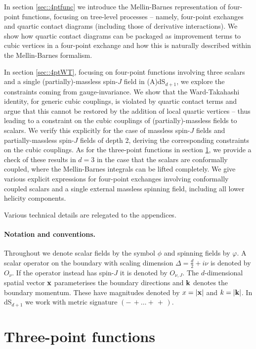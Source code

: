 \documentclass[11pt,a4paper]{article}
\begin{document}
In section \ref{sec::4ptfunc} we introduce the Mellin-Barnes representation of four-point functions, focusing on tree-level processes -- namely, four-point exchanges and quartic contact diagrams (including those of derivative interactions). We show how quartic contact diagrams can be packaged as improvement terms to cubic vertices in a four-point exchange and how this is naturally described within the Mellin-Barnes formalism.

In section \ref{sec::4ptWT}, focusing on four-point functions involving three scalars and a single (partially)-massless spin-$J$ field in (A)dS$_{d+1}$, we explore the constraints coming from gauge-invariance. We show that the Ward-Takahashi identity, for generic cubic couplings, is violated by quartic contact terms and argue that this cannot be restored by the addition of local quartic vertices -- thus leading to a constraint on the cubic couplings of (partially)-massless fields to scalars. We verify this explicitly for the case of massless spin-$J$ fields and partially-massless spin-$J$ fields of depth 2, deriving the corresponding constraints on the cubic couplings. As for the three-point functions in section \ref{sec::3pt}, we provide a check of these results in $d=3$ in the case that the scalars are conformally coupled, where the Mellin-Barnes integrals can be lifted completely. We give various explicit expressions for four-point exchanges involving conformally coupled scalars and a single external massless spinning field, including all lower helicity components.

Various technical details are relegated to the appendices.

\paragraph{Notation and conventions.} Throughout we denote scalar fields by the symbol $\phi$ and spinning fields by $\varphi$. A scalar operator on the boundary with scaling dimension $\Delta=\frac{d}{2}+i\nu$ is denoted by $O_\nu$. If the operator instead has spin-$J$ it is denoted by $O_{\nu,J}$. The $d$-dimensional spatial vector ${\bf x}$ parameterises the boundary directions and ${\bf k}$ denotes the boundary momentum. These have magnitudes denoted by $x=|{\bf x}|$ and $k=|{\bf k}|$. In dS$_{d+1}$ we work with metric signature $\left(-\,+ \ldots +\,+\,\right)$.

\section{Three-point functions}
\label{sec::3pt}
\end{document}
